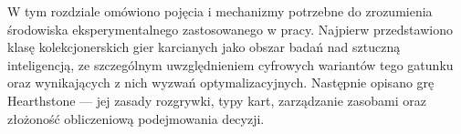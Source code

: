 \label{chapter:hearthstone}

W tym rozdziale omówiono pojęcia i mechanizmy potrzebne do zrozumienia środowiska eksperymentalnego zastosowanego w pracy. Najpierw przedstawiono klasę kolekcjonerskich gier karcianych jako obszar badań nad sztuczną inteligencją, ze szczególnym uwzględnieniem cyfrowych wariantów tego gatunku oraz wynikających z nich wyzwań optymalizacyjnych. Następnie opisano grę Hearthstone --- jej zasady rozgrywki, typy kart, zarządzanie zasobami oraz złożoność obliczeniową podejmowania decyzji.



